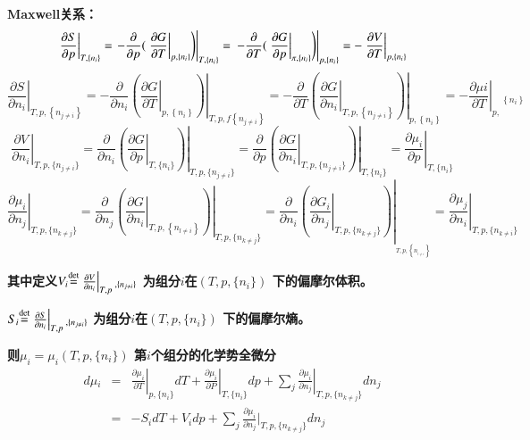\documentclass{article} %
\begin{document}
{\bf Maxwell关系：
\[\left. \left. \frac{\partial S}{\partial p} \right|_{T,\{ n_{i} \} } =\left. -\frac{\partial }{\partial p} {\rm (}\left. \frac{\partial G}{\partial T} \right|_{p,\{ n_{i} \} } \right)\right|_{T,\{ n_{i} \} } =\left. \left. -\frac{\partial }{\partial T} {\rm (}\left. \frac{\partial G}{\partial p} \right|_{\pi ,\{ n_{i} \} } \right)\right|_{p,\{ n_{i} \} } =-\left. \frac{\partial V}{\partial T} \right|_{p,\{ n_{i} \} } \] 
\[\left. \frac{\partial S}{\partial n_{i} } \right|_{T,p,\left\{n_{j\ne i} \right\}} =-\frac{\partial }{\partial n_{i} } \left. \left(\left. \frac{\partial G}{\partial T} \right|_{p,\left\{n_{i} \right\}} \right)\right|_{T,p,f\left\{n_{j\ne i} \right\}} =-\frac{\partial }{\partial T} \left. \left(\left. \frac{\partial G}{\partial n_{i} } \right|_{T,p,\left\{n_{j\ne i} \right\}} \right)\right|_{p,\left\{n_{i} \right\}} =-\left. \frac{\partial \mu i}{\partial T} \right|_{p,} {}_{\left\{n_{i} \right\}} \] 
\[\left. \left. \frac{\partial V}{\partial n_{i} } \right|_{T,p,\{ n_{j\ne i} \} } =\frac{\partial }{\partial n_{i} } \left(\left. \frac{\partial G}{\partial p} \right|_{T,\{ n_{i} \} } \right)\right|_{T,p,\{ n_{j\ne i} \} } =\frac{\partial }{\partial p} \left. \left(\left. \frac{\partial G}{\partial n_{i} } \right|_{T,p,\{ n_{j\ne i} \} } \right)\right|_{T,\{ n_{i} \} } =\left. \frac{\partial \mu _{i} }{\partial p} \right|_{T,\{ n_{i} \} } \] 
\[\left. \left. \left. \frac{\partial \mu _{i} }{\partial n_{j} } \right|_{T,p,\{ n_{k\ne j} \} } =\frac{\partial }{\partial n_{j} } \left(\left. \frac{\partial G}{\partial n_{i} } \right|_{T,p,\left\{n_{l\ne i} \right\}} \right)\right|_{T,p,\{ n_{k\ne j} \} } =\frac{\partial }{\partial n_{i} } \left(\left. \frac{\partial G_{i} }{\partial n_{j} } \right|_{T,p,\{ n_{k\ne j} \} } \right)\right|_{{}_{T,p,\left\{n_{{}_{l\ne i} } \right\}} } =\left. \frac{\partial \mu _{j} }{\partial n_{i} } \right|_{T,p,\{ n_{k\ne i} \} } \] }

{\bf 其中定义$V_{i} {\mathop{=}\limits^{{\rm det}}} \left. \frac{\partial V}{\partial n_{i} } \right|_{T,p} {}_{,\{ n_{j\ne i} \} } $ 为组分$i$在$(T,p,\{ n_{i} \} )$ 下的偏摩尔体积。}

\noindent 
{\bf         $S_{i} {\mathop{=}\limits^{{\rm det}}} \left. \frac{\partial S}{\partial n_{i} } \right|_{T,p} {}_{,\{ n_{j\ne i} \} } $ 为组分$i$在$(T,p,\{ n_{i} \} )$ 下的偏摩尔熵。}

\noindent 
{\bf 则$\mu _{i} =\mu _{i} (T,p,\{ n_{i} \} )$ 第$i$个组分的化学势全微分
\[\begin{array}{rcl} {d\mu {}_{i} } & {=} & {\left. \frac{\partial \mu _{i} }{\partial T} \right|_{p,\{ n_{i} \} } dT+\left. \frac{\partial \mu _{i} }{\partial P} \right|_{T,\{ n_{i} \} } dp+{\mathop{\sum }\limits_{j}} \left. \frac{\partial \mu _{i} }{\partial n_{j} } \right|_{T,p,\{ n_{k\ne j} \} } dn_{j} } \\ {} & {=} & {-S_{i} dT+V_{i} dp+{\mathop{\sum }\limits_{j}} \frac{\partial \mu _{i} }{\partial n_{j} } |_{T,p,\{ n_{k\ne j} \} } dn_{j} } \end{array}\] }
\end{document}
